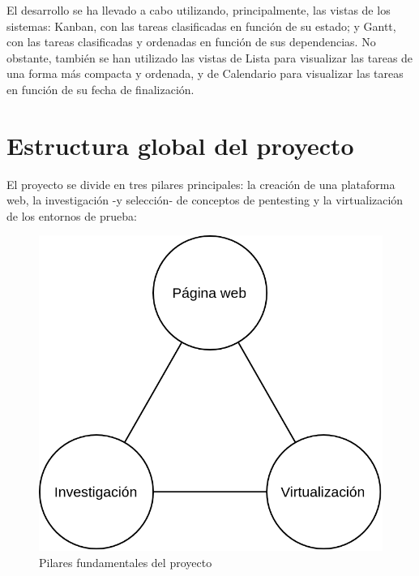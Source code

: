         El desarrollo se ha llevado a cabo utilizando, principalmente, las vistas de los sistemas: Kanban, con las tareas clasificadas en función de su estado; y Gantt, con las tareas clasificadas y ordenadas en función de sus dependencias. No obstante, también se han utilizado las vistas de Lista para visualizar las tareas de una forma más compacta y ordenada, y de Calendario para visualizar las tareas en función de su fecha de finalización.
        
        \newpage
    

    \section{Estructura global del proyecto}
        \label{sec:estructura-global}
        
        El proyecto se divide en tres pilares principales: la creación de una plataforma web, la investigación -y selección- de conceptos de pentesting y la virtualización de los entornos de prueba:
        
        \begin{figure}[h]
            \centering

            \includegraphics[scale=0.30]{images/Diagramas/Estructura global.png}
            
            \caption{Pilares fundamentales del proyecto}
            \label{fig:estructura-global}
        \end{figure}
            
